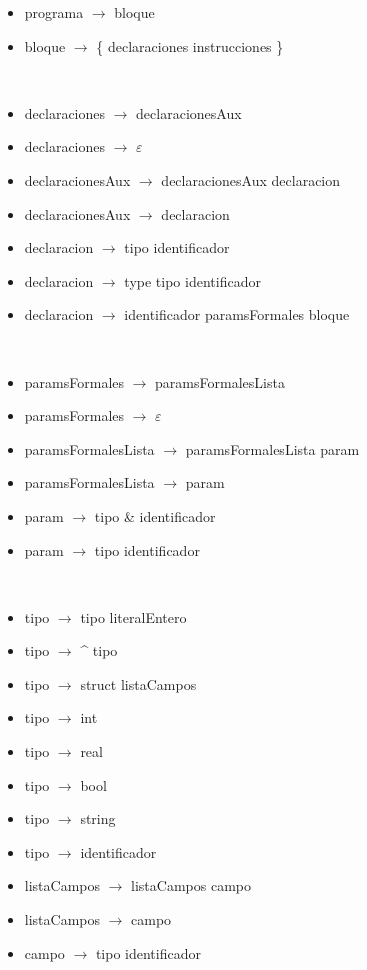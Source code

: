 \documentclass[11pt]{article}
\begin{document}
        \begin{itemize}
            \item programa $\rightarrow$ bloque
            \item bloque $\rightarrow$ \{ declaraciones instrucciones \}
        \end{itemize}
        \
        \begin{itemize}
            \item declaraciones $\rightarrow$ declaracionesAux
            \item declaraciones $\rightarrow$ $\varepsilon$
            \item declaracionesAux $\rightarrow$ declaracionesAux declaracion
            \item declaracionesAux $\rightarrow$ declaracion
            \item declaracion $\rightarrow$ tipo identificador
            \item declaracion $\rightarrow$ type tipo identificador
            \item declaracion $\rightarrow$ identificador paramsFormales bloque
        \end{itemize}
        \
        \begin{itemize}
            \item paramsFormales $\rightarrow$ paramsFormalesLista
            \item paramsFormales $\rightarrow$ $\varepsilon$
            \item paramsFormalesLista $\rightarrow$ paramsFormalesLista param 
            \item paramsFormalesLista $\rightarrow$ param
            \item param $\rightarrow$ tipo \& identificador 
            \item param $\rightarrow$ tipo identificador
        \end{itemize}
        \
        \begin{itemize}
            \item tipo $\rightarrow$ tipo literalEntero
            \item tipo $\rightarrow$ \^{} tipo
            \item tipo $\rightarrow$ struct listaCampos
            \item tipo $\rightarrow$ int
            \item tipo $\rightarrow$ real
            \item tipo $\rightarrow$ bool
            \item tipo $\rightarrow$ string
            \item tipo $\rightarrow$ identificador
            \item listaCampos $\rightarrow$ listaCampos campo
            \item listaCampos $\rightarrow$ campo
            \item campo $\rightarrow$ tipo identificador
        \end{itemize}
\end{document}
